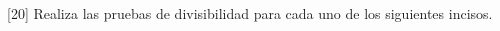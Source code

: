 [20] Realiza las pruebas de divisibilidad para cada uno de los siguientes incisos.
\begin{multicols}{2}
    \begin{parts}
        {\printanswers
            
        }
        
        
        
        
        
        
        
        
        
    \end{parts}
\end{multicols}